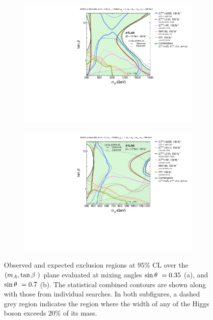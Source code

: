 \begin{figure}[h!]
    \centering
    \begin{subfigure}[2]{0.495\textwidth}
        \centering
        \includegraphics[width=\linewidth]{figures/fig_05a.pdf}
        \caption{}
        \label{fig:result-mA-tanb-scan-a}
    \end{subfigure}
    \begin{subfigure}[2]{0.495\textwidth}
        \centering
        \includegraphics[width=\linewidth]{figures/fig_05b.pdf}
        \caption{}
        \label{fig:result-mA-tanb-scan-b}
    \end{subfigure}
    \caption{Observed and expected exclusion regions at $95\%$ CL over the $(m_A, \tan\beta~)$ plane evaluated at \thdma mixing angles $\sin\theta~=0.35$ (a), and $\sin\theta~=0.7$ (b). The statistical combined contours are shown along with those from individual searches. In both subfigures, a dashed grey region indicates the region where the width of any of the Higgs boson exceeds $20\%$ of its mass. }
    \label{fig:result-mA-tanb-scan}
\end{figure} 

